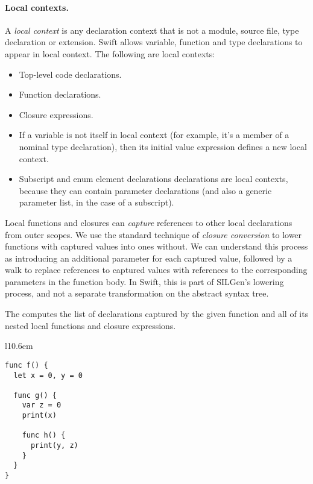 \documentclass[../generics]{subfiles}
\begin{document}
\paragraph{Local contexts.}
A \emph{local context} is any declaration context that is not a module, source file, type declaration or extension. Swift allows variable, function and type declarations to appear in local context. The following are local contexts:
\begin{itemize}
\item {}Top-level code declarations.
\item Function declarations.
\item {}Closure expressions.
\item If a variable is not itself in local context (for example, it's a member of a nominal type declaration), then its initial value expression defines a new local context.
\item {}Subscript and enum element declarations declarations are local contexts, because they can contain parameter declarations (and also a generic parameter list, in the case of a subscript).
\end{itemize}

Local functions and closures can \emph{capture} references to other local declarations from outer scopes. We use the standard technique of \emph{closure conversion} to lower functions with captured values into ones without. We can understand this process as introducing an additional parameter for each captured value, followed by a walk to replace references to captured values with references to the corresponding parameters in the function body. In Swift, this is part of SILGen's lowering process, and not a separate transformation on the abstract syntax tree.

The  computes the list of declarations captured by the given function and all of its nested local functions and closure expressions.

\begin{wrapfigure}[10]{l}{10.6em}
  \begin{minipage}{10.5em}
\begin{Verbatim}
func f() {
  let x = 0, y = 0

  func g() {
    var z = 0
    print(x)

    func h() {
      print(y, z)
    }
  }
}
\end{Verbatim}
\end{minipage}
\end{wrapfigure}
\end{document}
